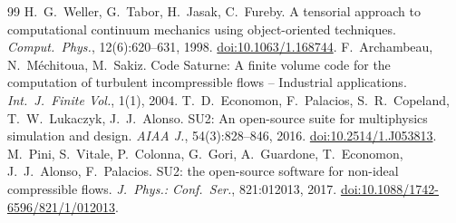 \documentclass[11pt]{article}
\begin{document}
\begin{thebibliography}{99}
 H.\ G.\ Weller, G.\ Tabor, H.\ Jasak, C.\ Fureby. A tensorial approach to computational continuum mechanics using object-oriented techniques. \emph{Comput.\ Phys.}, 12(6):620--631, 1998. \href{https://doi.org/10.1063/1.168744}{doi:10.1063/1.168744}.
 F.\ Archambeau, N.\ M\'echitoua, M.\ Sakiz. Code Saturne: A finite volume code for the computation of turbulent incompressible flows -- Industrial applications. \emph{Int.\ J.\ Finite Vol.}, 1(1), 2004.
 T.\ D.\ Economon, F.\ Palacios, S.\ R.\ Copeland, T.\ W.\ Lukaczyk, J.\ J.\ Alonso. SU2: An open-source suite for multiphysics simulation and design. \emph{AIAA J.}, 54(3):828--846, 2016. \href{https://doi.org/10.2514/1.J053813}{doi:10.2514/1.J053813}.
 M.\ Pini, S.\ Vitale, P.\ Colonna, G.\ Gori, A.\ Guardone, T.\ Economon, J.\ J.\ Alonso, F.\ Palacios. SU2: the open-source software for non-ideal compressible flows. \emph{J.\ Phys.: Conf.\ Ser.}, 821:012013, 2017. \href{https://doi.org/10.1088/1742-6596/821/1/012013}{doi:10.1088/1742-6596/821/1/012013}.
\end{thebibliography}
\end{document}
